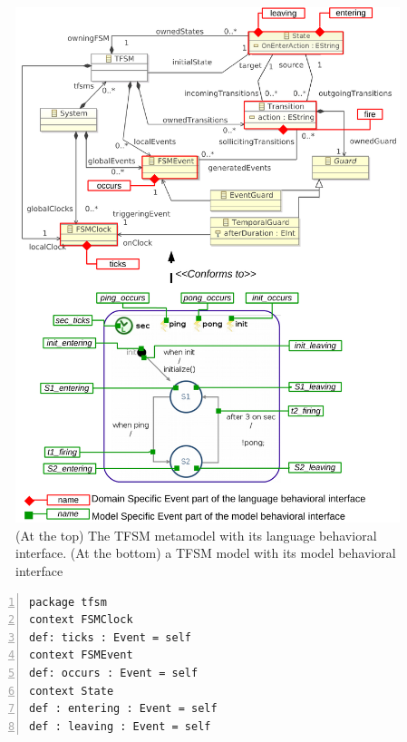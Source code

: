 \begin{figure}
	\begin{center}
		\includegraphics[width=1\textwidth]{bcool/figs/tfsmlang}
		\caption{(At the top) The TFSM metamodel with its language behavioral interface. (At the bottom)  a TFSM model with its model behavioral interface}
		\label{fig:tfsmmm}
	\end{center}
\end{figure}

\begin{lstlisting}[language=ecl,
caption={Partial \ecl specification of TFSM},
label={fig:tfsmmmecl}, 
basicstyle=\scriptsize\ttfamily, backgroundcolor=\color{LGrey}, numbers=left, xleftmargin=3pt]
package tfsm
context FSMClock
def: ticks : Event = self
context FSMEvent
def: occurs : Event = self
context State
def : entering : Event = self
def : leaving : Event = self
\end{lstlisting}


